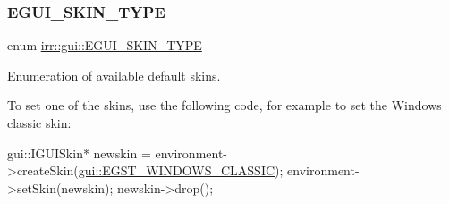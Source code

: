 \subsubsection{\texorpdfstring{E\+G\+U\+I\+\_\+\+S\+K\+I\+N\+\_\+\+T\+Y\+PE}{EGUI\_SKIN\_TYPE}}
{\footnotesize\ttfamily enum \hyperlink{namespaceirr_1_1gui_a7b4619db540cbdf96e81023893b4eca5}{irr\+::gui\+::\+E\+G\+U\+I\+\_\+\+S\+K\+I\+N\+\_\+\+T\+Y\+PE}}



Enumeration of available default skins. 

To set one of the skins, use the following code, for example to set the Windows classic skin\+: 
\begin{DoxyCode}
gui::IGUISkin* newskin = environment->createSkin(\hyperlink{namespaceirr_1_1gui_a7b4619db540cbdf96e81023893b4eca5a4bc61097b84978277791e5e4b2fcfb03}{gui::EGST\_WINDOWS\_CLASSIC});
environment->setSkin(newskin);
newskin->drop();
\end{DoxyCode}
